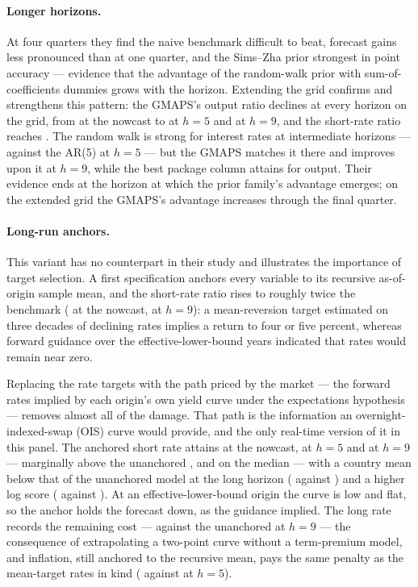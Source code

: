 \paragraph{Longer horizons.} At four quarters they find the naive benchmark difficult to
beat, forecast gains less pronounced than at one quarter, and the Sims--Zha prior
strongest in point accuracy --- evidence that the advantage of the random-walk prior with
sum-of-coefficients dummies grows with the horizon. Extending the grid confirms and
strengthens this pattern: the GMAPS's output ratio declines at every horizon on the
grid, from \CmGbvarYHOne{} at the nowcast to \CmGbvarYHFive{} at $h=5$ and
\CmGbvarYHNine{} at $h=9$, and the short-rate ratio reaches \CmGbvarRHNine{}. The random
walk is strong for interest rates at intermediate horizons --- \CmRwRHFive{} against the
AR(5) at $h=5$ --- but the GMAPS matches it there and improves upon it at $h=9$, while
the best package column attains \CmMnYHNine{} for output. Their evidence ends at the
horizon at which the prior family's advantage emerges; on the extended grid the GMAPS's
advantage increases through the final quarter.

\paragraph{Long-run anchors.} This variant has no counterpart in their study and
illustrates the importance of target selection. A first specification anchors every
variable to its recursive as-of-origin sample mean, and the short-rate ratio rises to
roughly twice the benchmark (\CmAnchMeanRHOne{} at the nowcast, \CmAnchMeanRHNine{} at
$h=9$): a mean-reversion target estimated on three decades of declining rates implies a
return to four or five percent, whereas forward guidance over the effective-lower-bound
years indicated that rates would remain near zero.

Replacing the rate targets with the path priced by the market --- the forward rates
implied by each origin's own yield curve under the expectations hypothesis --- removes
almost all of the damage. That path is the information an overnight-indexed-swap (OIS)
curve would provide, and the only real-time version of it in this panel. The anchored
short rate attains \CmAnchRHOne{} at the nowcast, \CmAnchRHFive{} at $h=5$ and
\CmAnchRHNine{} at $h=9$ --- marginally above the unanchored \CmGbvarRHOne{},
\CmGbvarRHFive{} and \CmGbvarRHNine{} on the median --- with a country mean below that of
the unanchored model at the long horizon (\CmAnchRMeanHNine{} against
\CmGbvarRMeanHNine{}) and a higher log score (\CmAnchRLpsHNine{} against
\CmGbvarRLpsHNine{}). At an effective-lower-bound origin the curve is low and flat, so
the anchor holds the forecast down, as the guidance implied. The long rate records the
remaining cost --- \CmAnchLrHNine{} against the unanchored \CmGbvarLrHNine{} at $h=9$ ---
the consequence of extrapolating a two-point curve without a term-premium model, and
inflation, still anchored to the recursive mean, pays the same penalty as the mean-target
rates in kind (\CmAnchDpHFive{} against \CmGbvarDpHFive{} at $h=5$).

